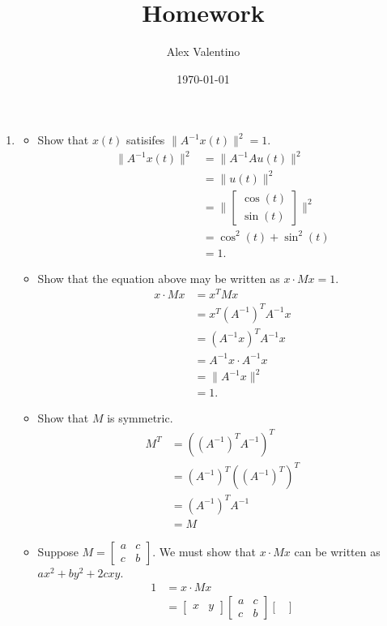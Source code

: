\documentclass[12pt, letterpaper]{article}
\date{\today}
\author{Alex Valentino}
\title{Homework }
\begin{document}
	\begin{enumerate}
		\item 
		\begin{itemize}
			\item Show that $x(t)$ satisifes $\| A^{-1} x(t)\|^2 = 1$.
			\begin{align*}
				\| A^{-1} x(t)\|^2 &= \| A^{-1} A u(t)\|^2\\
				&= \| u(t)\|^2\\
				&= \| \begin{bmatrix}
				\cos(t)\\
				\sin(t)
				\end{bmatrix}\|^2\\
				&= \cos^2(t) + \sin^2(t)\\
				&= 1.
			\end{align*}
			\item Show that the equation above may be written as $x \cdot M x = 1$.
			\begin{align*}
				x \cdot M x &= x^T M x\\
				&= x^T (A^{-1})^T A^{-1} x\\
				&= (A^{-1}x)^T A^{-1}x\\
				&= A^{-1}x \cdot A^{-1}x\\
				&= \|A^{-1}x\|^2 \\
				&= 1.
			\end{align*}
			\item Show that $M$ is symmetric.
			\begin{align*}
			M^T &= ((A^{-1})^T A^{-1})^T\\
			&= (A^{-1})^T ((A^{-1})^T)^T\\
			&= (A^{-1})^T A^{-1}\\
			&= M
			\end{align*}
			\item Suppose $M = \begin{bmatrix}
			a & c \\ c & b
\end{bmatrix}			 $.  We must show that $x \cdot M x$ can be written as $ax^2 + by^2 + 2cxy$.
			\begin{align*}
				1 &= x \cdot M x\\
				&= \begin{bmatrix}
				x & y
				\end{bmatrix}\begin{bmatrix}
			a & c \\ c & b
\end{bmatrix}\begin{bmatrix}

\end{bmatrix}
\end{align*}
\end{itemize}
\end{enumerate}
\end{document}
